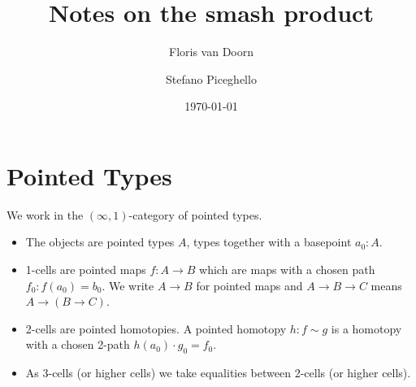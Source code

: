 \documentclass{article}
\title{Notes on the smash product}
\author{Floris van Doorn \and Stefano Piceghello}
\date{\today}
\newcommand{\pmap}{\to}
\newcommand{\tr}{\cdot}
\begin{document}
\maketitle

\section{Pointed Types}

\begin{defn}
  We work in the $(\infty,1)$-category of pointed types.
  \begin{itemize}
  \item The objects are pointed types $A$, types together with a basepoint $a_0:A$.
\item 1-cells are pointed maps $f:A\to B$ which are maps with a chosen path $f_0:f(a_0)=b_0$. We
  write $A\pmap B$ for pointed maps and $A\pmap B\pmap C$ means $A\pmap (B\pmap C)$.
\item 2-cells are pointed homotopies. A pointed homotopy $h:f\sim g$ is a homotopy with a chosen 2-path
  $h(a_0) \tr g_0 = f_0$.
\item As 3-cells (or higher cells) we take equalities between 2-cells (or higher cells).
\end{itemize}
\end{defn}
\end{document}
